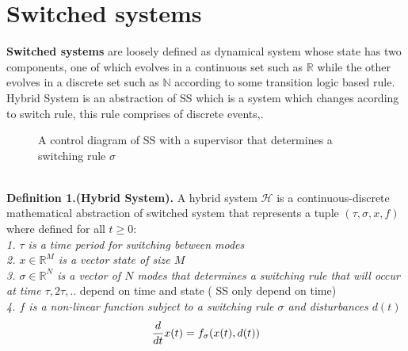   \section{Switched systems}
    \label{sec:switchedsystems}
    \textbf{Switched systems} are loosely defined as dynamical 
    system whose state has two components, one of which evolves 
    in a continuous set such as $\mathbb{R}$  while the other 
    evolves in a discrete set such as $\mathbb{N}$ according to 
    some transition logic based rule. Hybrid System is an abstraction
    of \ac{SS} which is a system which changes acording to switch 
    rule, this rule comprises of discrete events,\citep{branicky1994stability}.    
    \begin{figure}[!hbt]
      \centering
      
      \captionsetup{format=hang}
      \caption{A control diagram of \ac{SS} with a supervisor that determines a switching rule $\sigma$}
      \label{fig:switchedsystem}
    \end{figure}
    \\
    \textbf{Definition 1.(Hybrid System).} A hybrid system $\mathcal{H}$ is a
    continuous-discrete mathematical abstraction of switched system that represents a 
    tuple $(\tau,\sigma,x,f)$ where defined for all $t \geqslant 0$: \\
    \emph{1. $\tau$ is a time period for switching between modes} \\
    \emph{2. $x \in \mathbb{R}^{M} $ is a vector state of size $M$} \\
    \emph{3. $\sigma \in \mathbb{R}^{N}$ is a vector of $N$ modes that determines a switching rule that will occur at time $\tau,2\tau,..$} depend on time and state ( \ac{SS} only depend on time)\\
    \emph{4. $f$ is a non-linear function subject to a switching rule $\sigma$ and disturbances $d(t)$} \\
    \begin{equation}
        \label{eq:hybridsystem}
        \frac{d}{dt}x(t) = f_{\sigma}(x(t),d(t)) \\
    \end{equation}

    \clearpage
